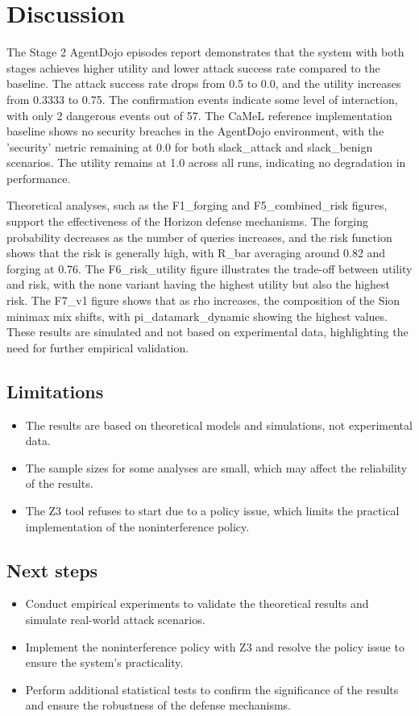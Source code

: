 \documentclass[11pt,a4paper]{article}
\begin{document}
\section{Discussion}
The Stage 2 AgentDojo episodes report demonstrates that the system with both stages achieves higher utility and lower attack success rate compared to the baseline. The attack success rate drops from 0.5 to 0.0, and the utility increases from 0.3333 to 0.75. The confirmation events indicate some level of interaction, with only 2 dangerous events out of 57. The CaMeL reference implementation baseline shows no security breaches in the AgentDojo environment, with the 'security' metric remaining at 0.0 for both slack\_attack and slack\_benign scenarios. The utility remains at 1.0 across all runs, indicating no degradation in performance.

Theoretical analyses, such as the F1\_forging and F5\_combined\_risk figures, support the effectiveness of the Horizon defense mechanisms. The forging probability decreases as the number of queries increases, and the risk function shows that the risk is generally high, with R\_bar averaging around 0.82 and forging at 0.76. The F6\_risk\_utility figure illustrates the trade-off between utility and risk, with the none variant having the highest utility but also the highest risk. The F7\_v1 figure shows that as rho increases, the composition of the Sion minimax mix shifts, with pi\_datamark\_dynamic showing the highest values. These results are simulated and not based on experimental data, highlighting the need for further empirical validation.

\subsection{Limitations}
\begin{itemize}
\item The results are based on theoretical models and simulations, not experimental data.
\item The sample sizes for some analyses are small, which may affect the reliability of the results.
\item The Z3 tool refuses to start due to a policy issue, which limits the practical implementation of the noninterference policy.
\end{itemize}
\subsection{Next steps}
\begin{itemize}
\item Conduct empirical experiments to validate the theoretical results and simulate real-world attack scenarios.
\item Implement the noninterference policy with Z3 and resolve the policy issue to ensure the system's practicality.
\item Perform additional statistical tests to confirm the significance of the results and ensure the robustness of the defense mechanisms.
\end{itemize}
\appendix
\end{document}
